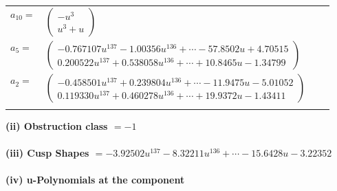 \documentclass[1p]{elsarticle_modified}
\theoremstyle{definition}
\begin{document}
\begin{tabular}{m{7pt} m{180pt} m{7pt} m{180pt} }
\flushright $a_{10}=$&$\begin{pmatrix}- u^3\\u^3+u\end{pmatrix}$ \\
\flushright $a_{5}=$&$\begin{pmatrix}-0.767107 u^{137}-1.00356 u^{136}+\cdots-57.8502 u+4.70515\\0.200522 u^{137}+0.538058 u^{136}+\cdots+10.8465 u-1.34799\end{pmatrix}$ \\
\flushright $a_{2}=$&$\begin{pmatrix}-0.458501 u^{137}+0.239804 u^{136}+\cdots-11.9475 u-5.01052\\0.119330 u^{137}+0.460278 u^{136}+\cdots+19.9372 u-1.43411\end{pmatrix}$\\&\end{tabular}
\flushleft \textbf{(ii) Obstruction class $= -1$}\\~\\
\flushleft \textbf{(iii) Cusp Shapes $= -3.92502 u^{137}-8.32211 u^{136}+\cdots-15.6428 u-3.22352$}\\~\\
\newpage\renewcommand{\arraystretch}{1}
\flushleft \textbf{(iv) u-Polynomials at the component}\newline \\
\end{document}
